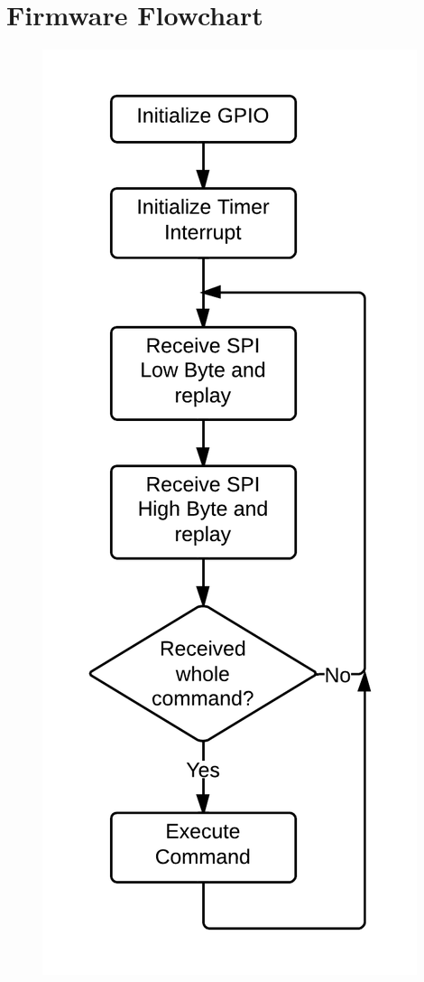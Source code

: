 \chapter{Firmware Flowchart}

\begin{figure}[!ht]
	\centering
	\begin{minipage}{.45\textwidth}
		\centering
		\includegraphics[width=.75\textwidth]{software-design/c2000-main.png}

\end{minipage}
\end{figure}
